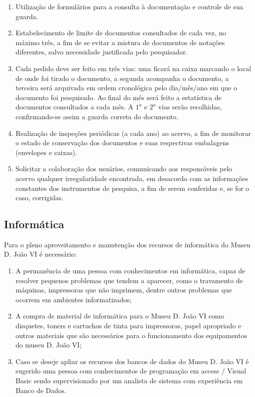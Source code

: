 \begin{enumerate}
\begin{enumerate}
			\item Utilização de formulários para a consulta à documentação e controle de sua guarda.
			\item Estabelecimento de limite de documentos consultados de cada vez, no máximo três, a fim de se evitar a mistura de documentos de notações diferentes, salvo necessidade justificada pelo pesquisador.
			\item Cada pedido deve ser feito em três vias: uma ficará na caixa marcando o local de onde foi tirado o documento, a segunda acompanha o documento, a terceira será arquivada em ordem cronológica pelo dia/mês/ano em que o documento foi pesquisado. Ao final do mês será feito a estatística de documentos consultados a cada mês. A $1^a$ e $2^a$ vias serão recolhidas, confirmando-se assim a guarda correta do documento.
			\item Realização de inspeções periódicas (a cada ano) ao acervo, a fim de monitorar o estado de conservação dos documentos e suas respectivas embalagens (envelopes e caixas).
			\item Solicitar a colaboração dos usuários, comunicando aos responsáveis pelo acervo qualquer irregularidade encontrada, em desacordo com as informações constantes dos instrumentos de pesquisa, a fim de serem conferidas e, se for o caso, corrigidas.
		\end{enumerate}
\end{enumerate}

\subsection{Informática}

Para o pleno aproveitamento e manutenção dos recursos de informática do Museu D. João VI é necessário:

\begin{enumerate}
	\item A permanência de uma pessoa com conhecimentos em informática, capaz de resolver pequenos problemas que tendem a aparecer, como o travamento de máquinas, impressoras que não imprimem, dentre outros problemas que ocorrem em ambientes informatizados;
	\item A compra de material de informática para o Museu D. João VI como disquetes, toners e cartuchos de tinta para impressoras, papel apropriado e outros materiais que são necessários para o funcionamento dos equipamentos do museu D. João VI;
	\item Caso se deseje apliar os recursos dos bancos de dados do Museu D. João VI é sugerido uma pessoa com conhecimentos de programação em access / Visual Basic sendo supervisionado por um analista de sistema com experiência em Banco de Dados.
\end{enumerate}

